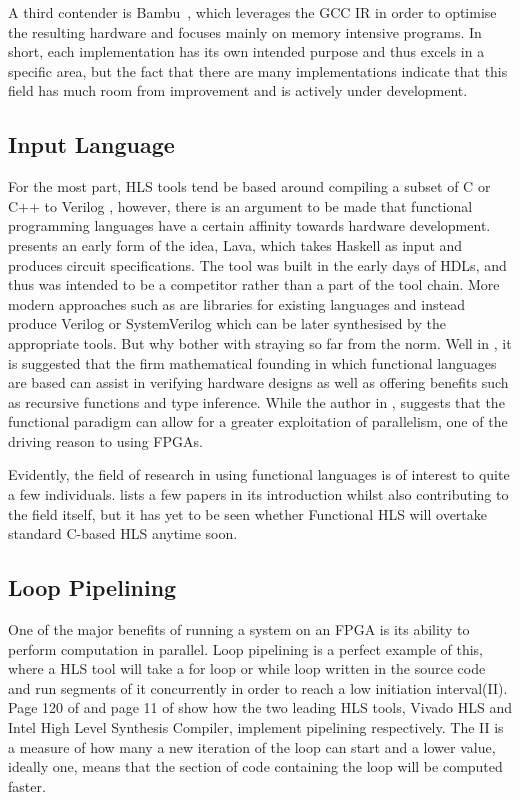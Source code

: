 A third contender is Bambu~\cite{6645550}, which leverages the GCC IR in order to optimise the resulting hardware and focuses mainly on memory intensive programs. In short, each implementation has its own intended purpose and thus excels in a specific area, but the fact that there are many implementations indicate that this field has much room from improvement and is actively under development.

\subsection{Input Language}

For the most part, HLS tools tend be based around compiling a subset of C or C++ to Verilog \cite{7368920}, however, there is an argument to be made that functional programming languages have a certain affinity towards hardware development. \cite{bjesse1998lava} presents an early form of the idea, Lava, which takes Haskell as input and produces circuit specifications. The tool was built in the early days of HDLs, and thus was intended to be a competitor rather than a part of the tool chain. More modern approaches such as \cite{hardcaml} are libraries for existing languages and instead produce Verilog or SystemVerilog which can be later synthesised by the appropriate tools. But why bother with straying so far from the norm. Well in \cite{7331371}, it is suggested that the firm mathematical founding in which functional languages are based can assist in verifying hardware designs as well as offering benefits such as recursive functions and type inference. While the author in \cite{Edwards2019FHWP}, suggests that the functional paradigm can allow for a greater exploitation of parallelism, one of the driving reason to using FPGAs. 

Evidently, the field of research in using functional languages is of interest to quite a few individuals. \cite{7723553} lists a few papers in its introduction whilst also contributing to the field itself, but it has yet to be seen whether Functional HLS will overtake standard C-based HLS anytime soon.

\subsection{Loop Pipelining}

One of the major benefits of running a system on an FPGA is its ability to perform computation in parallel. Loop pipelining is a perfect example of this, where a HLS tool will take a for loop or while loop written in the source code and run segments of it concurrently in order to reach a low initiation interval(II). Page 120 of \cite{vivado-optmisation-manual} and page 11 of \cite{intel-hls-manual} show how the two leading HLS tools, Vivado HLS and Intel High Level Synthesis Compiler, implement pipelining respectively. The II is a measure of how many a new iteration of the loop can start and a lower value, ideally one, means that the section of code containing the loop will be computed faster. 

